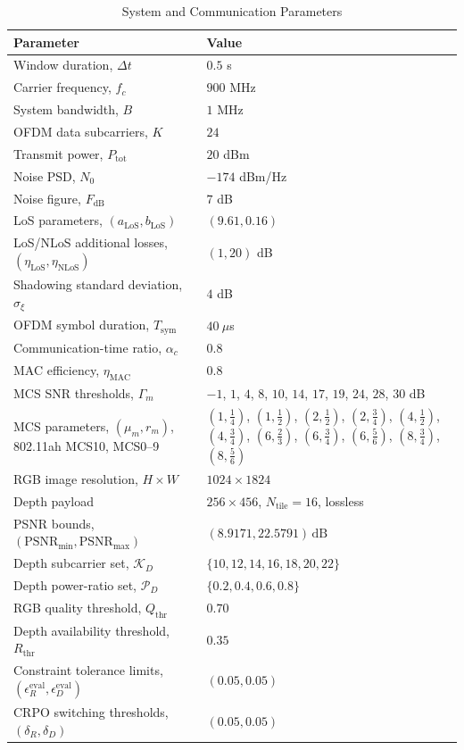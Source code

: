 \documentclass[journal]{IEEEtran}
\begin{document}
\begin{table}[t]
\centering
\caption{System and Communication Parameters}
\label{tab:system_communication_parameters}
\footnotesize
\setlength{\tabcolsep}{3pt}
\renewcommand{\arraystretch}{1.08}
\begin{tabular}{@{}p{}p{}@{}}
\hline
Parameter & Value \\
\hline
Window duration, $\Delta t$ & $0.5$ s \\
Carrier frequency, $f_c$ & $900$ MHz \\
System bandwidth, $B$ & $1$ MHz \\
OFDM data subcarriers, $K$ & $24$ \\
Transmit power, $P_{\mathrm{tot}}$ & $20$ dBm \\
Noise PSD, $N_0$ & $-174$ dBm/Hz \\
Noise figure, $F_{\mathrm{dB}}$ & $7$ dB \\
LoS parameters, $(a_{\mathrm{LoS}}, b_{\mathrm{LoS}})$ & $(9.61,0.16)$ \\
LoS/NLoS additional losses, $(\eta_{\mathrm{LoS}},\eta_{\mathrm{NLoS}})$ & $(1,20)$ dB \\
Shadowing standard deviation, $\sigma_{\xi}$ & $4$ dB \\
OFDM symbol duration, $T_{\mathrm{sym}}$ & $40~\mu$s \\
Communication-time ratio, $\alpha_c$ & $0.8$ \\
MAC efficiency, $\eta_{\mathrm{MAC}}$ & $0.8$ \\
MCS SNR thresholds, $\Gamma_m$ & $-1$, $1$, $4$, $8$, $10$, $14$, $17$, $19$, $24$, $28$, $30$ dB \\
MCS parameters, $(\mu_m, r_m)$, 802.11ah MCS10, MCS0--9 & $(1,\frac14)$, $(1,\frac12)$, $(2,\frac12)$, $(2,\frac34)$, $(4,\frac12)$, $(4,\frac34)$, $(6,\frac23)$, $(6,\frac34)$, $(6,\frac56)$, $(8,\frac34)$, $(8,\frac56)$ \\
RGB image resolution, $H\times W$ & $1024\times1824$ \\
Depth payload & $256\times456$, $N_{\mathrm{tile}}=16$, lossless \\
PSNR bounds, $(\mathrm{PSNR}_{\min},\mathrm{PSNR}_{\max})$
& $(8.9171,22.5791)\,\mathrm{dB}$ \\
Depth subcarrier set, $\mathcal{K}_D$ & $\{10,12,14,16,18,20,22\}$ \\
Depth power-ratio set, $\mathcal{P}_D$ & $\{0.2,0.4,0.6,0.8\}$ \\
RGB quality threshold, $Q_{\mathrm{thr}}$ & $0.70$ \\
Depth availability threshold, $R_{\mathrm{thr}}$ & $0.35$ \\
Constraint tolerance limits, $(\epsilon_R^{\mathrm{eval}},\epsilon_D^{\mathrm{eval}})$ & $(0.05,0.05)$ \\
CRPO switching thresholds, $(\delta_R,\delta_D)$ & $(0.05,0.05)$ \\
\hline
\end{tabular}
\end{table}
\end{document}
